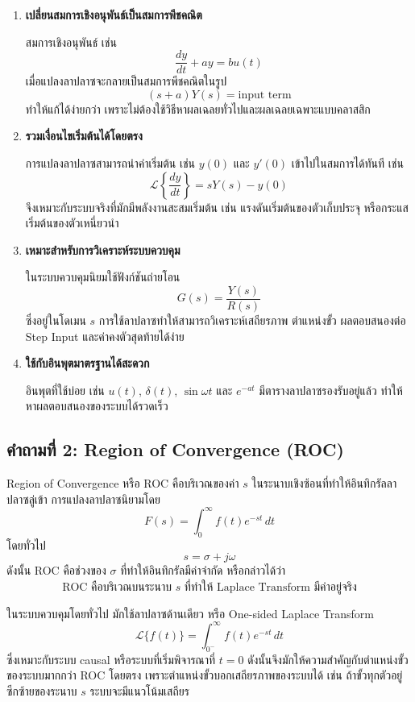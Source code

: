 \begin{enumerate}
    \item \textbf{เปลี่ยนสมการเชิงอนุพันธ์เป็นสมการพีชคณิต}
    
    สมการเชิงอนุพันธ์ เช่น
    \[
    \frac{dy}{dt}+ay=bu(t)
    \]
    เมื่อแปลงลาปลาซจะกลายเป็นสมการพีชคณิตในรูป
    \[
    (s+a)Y(s)=\text{input term}
    \]
    ทำให้แก้ได้ง่ายกว่า เพราะไม่ต้องใช้วิธีหาผลเฉลยทั่วไปและผลเฉลยเฉพาะแบบคลาสสิก

    \item \textbf{รวมเงื่อนไขเริ่มต้นได้โดยตรง}
    
    การแปลงลาปลาซสามารถนำค่าเริ่มต้น เช่น $y(0)$ และ $y'(0)$ เข้าไปในสมการได้ทันที เช่น
    \[
    \mathcal{L}\left\{\frac{dy}{dt}\right\}=sY(s)-y(0)
    \]
    จึงเหมาะกับระบบจริงที่มักมีพลังงานสะสมเริ่มต้น เช่น แรงดันเริ่มต้นของตัวเก็บประจุ หรือกระแสเริ่มต้นของตัวเหนี่ยวนำ

    \item \textbf{เหมาะสำหรับการวิเคราะห์ระบบควบคุม}
    
    ในระบบควบคุมนิยมใช้ฟังก์ชันถ่ายโอน
    \[
    G(s)=\frac{Y(s)}{R(s)}
    \]
    ซึ่งอยู่ในโดเมน $s$ การใช้ลาปลาซทำให้สามารถวิเคราะห์เสถียรภาพ ตำแหน่งขั้ว ผลตอบสนองต่อ Step Input และค่าคงตัวสุดท้ายได้ง่าย

    \item \textbf{ใช้กับอินพุตมาตรฐานได้สะดวก}
    
    อินพุตที่ใช้บ่อย เช่น $u(t)$, $\delta(t)$, $\sin \omega t$ และ $e^{-at}$ มีตารางลาปลาซรองรับอยู่แล้ว ทำให้หาผลตอบสนองของระบบได้รวดเร็ว
\end{enumerate}

\subsection{คำถามที่ 2: Region of Convergence (ROC)}

Region of Convergence หรือ ROC คือบริเวณของค่า $s$ ในระนาบเชิงซ้อนที่ทำให้อินทิกรัลลาปลาซลู่เข้า การแปลงลาปลาซนิยามโดย
\[
F(s)=\int_{0}^{\infty}f(t)e^{-st}\,dt
\]
โดยทั่วไป
\[
s=\sigma+j\omega
\]
ดังนั้น ROC คือช่วงของ $\sigma$ ที่ทำให้อินทิกรัลมีค่าจำกัด หรือกล่าวได้ว่า
\[
\boxed{\text{ROC คือบริเวณบนระนาบ }s\text{ ที่ทำให้ Laplace Transform มีค่าอยู่จริง}}
\]

ในระบบควบคุมโดยทั่วไป มักใช้ลาปลาซด้านเดียว หรือ One-sided Laplace Transform
\[
\mathcal{L}\{f(t)\}=\int_{0^-}^{\infty}f(t)e^{-st}\,dt
\]
ซึ่งเหมาะกับระบบ causal หรือระบบที่เริ่มพิจารณาที่ $t=0$ ดังนั้นจึงมักให้ความสำคัญกับตำแหน่งขั้วของระบบมากกว่า ROC โดยตรง เพราะตำแหน่งขั้วบอกเสถียรภาพของระบบได้ เช่น ถ้าขั้วทุกตัวอยู่ซีกซ้ายของระนาบ $s$ ระบบจะมีแนวโน้มเสถียร

